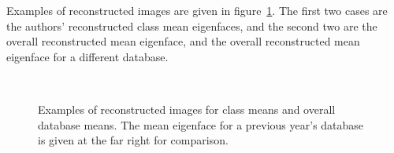Examples of reconstructed images are given in figure~\ref{fig:reconstructed-means}. The first two cases are the authors' reconstructed class mean eigenfaces, and the second two are the overall reconstructed mean eigenface, and the overall reconstructed mean eigenface for a different database.

\begin{figure}[h!]
 \centering
 \\
 \caption[Examples of reconstructed images]{Examples of reconstructed images for class means and overall database means. The mean eigenface for a previous year's database is given at the far right for comparison.}
 \label{fig:reconstructed-means}
\end{figure}

